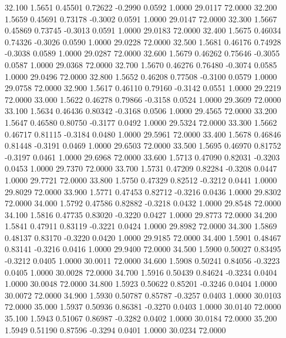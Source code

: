   32.100   1.5651   0.45501   0.72622  -0.2990   0.0592   1.0000  29.0117  72.0000
  32.200   1.5659   0.45691   0.73178  -0.3002   0.0591   1.0000  29.0147  72.0000
  32.300   1.5667   0.45869   0.73745  -0.3013   0.0591   1.0000  29.0183  72.0000
  32.400   1.5675   0.46034   0.74326  -0.3026   0.0590   1.0000  29.0228  72.0000
  32.500   1.5681   0.46176   0.74928  -0.3038   0.0589   1.0000  29.0287  72.0000
  32.600   1.5679   0.46262   0.75646  -0.3055   0.0587   1.0000  29.0368  72.0000
  32.700   1.5670   0.46276   0.76480  -0.3074   0.0585   1.0000  29.0496  72.0000
  32.800   1.5652   0.46208   0.77508  -0.3100   0.0579   1.0000  29.0758  72.0000
  32.900   1.5617   0.46110   0.79160  -0.3142   0.0551   1.0000  29.2219  72.0000
  33.000   1.5622   0.46278   0.79866  -0.3158   0.0524   1.0000  29.3609  72.0000
  33.100   1.5634   0.46436   0.80342  -0.3168   0.0506   1.0000  29.4565  72.0000
  33.200   1.5647   0.46580   0.80750  -0.3177   0.0492   1.0000  29.5324  72.0000
  33.300   1.5662   0.46717   0.81115  -0.3184   0.0480   1.0000  29.5961  72.0000
  33.400   1.5678   0.46846   0.81448  -0.3191   0.0469   1.0000  29.6503  72.0000
  33.500   1.5695   0.46970   0.81752  -0.3197   0.0461   1.0000  29.6968  72.0000
  33.600   1.5713   0.47090   0.82031  -0.3203   0.0453   1.0000  29.7370  72.0000
  33.700   1.5731   0.47209   0.82284  -0.3208   0.0447   1.0000  29.7721  72.0000
  33.800   1.5750   0.47329   0.82512  -0.3212   0.0441   1.0000  29.8029  72.0000
  33.900   1.5771   0.47453   0.82712  -0.3216   0.0436   1.0000  29.8302  72.0000
  34.000   1.5792   0.47586   0.82882  -0.3218   0.0432   1.0000  29.8548  72.0000
  34.100   1.5816   0.47735   0.83020  -0.3220   0.0427   1.0000  29.8773  72.0000
  34.200   1.5841   0.47911   0.83119  -0.3221   0.0424   1.0000  29.8982  72.0000
  34.300   1.5869   0.48137   0.83170  -0.3220   0.0420   1.0000  29.9185  72.0000
  34.400   1.5901   0.48467   0.83141  -0.3216   0.0416   1.0000  29.9400  72.0000
  34.500   1.5900   0.50027   0.83495  -0.3212   0.0405   1.0000  30.0011  72.0000
  34.600   1.5908   0.50241   0.84056  -0.3223   0.0405   1.0000  30.0028  72.0000
  34.700   1.5916   0.50439   0.84624  -0.3234   0.0404   1.0000  30.0048  72.0000
  34.800   1.5923   0.50622   0.85201  -0.3246   0.0404   1.0000  30.0072  72.0000
  34.900   1.5930   0.50787   0.85787  -0.3257   0.0403   1.0000  30.0103  72.0000
  35.000   1.5937   0.50936   0.86381  -0.3270   0.0403   1.0000  30.0140  72.0000
  35.100   1.5943   0.51067   0.86987  -0.3282   0.0402   1.0000  30.0184  72.0000
  35.200   1.5949   0.51190   0.87596  -0.3294   0.0401   1.0000  30.0234  72.0000
